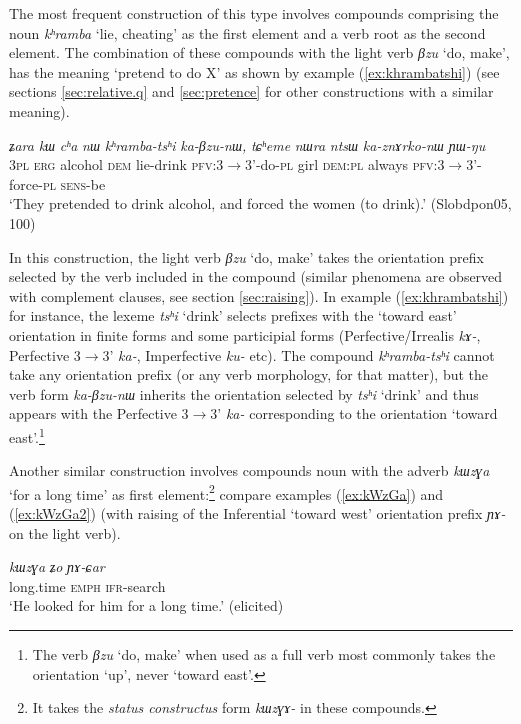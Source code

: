 \documentclass[oneside,a4paper,11pt]{article}
\newcommand{\ipa}[1]{\textit{\phon#1}}
\newcommand{\jpg}[2]{\ipa{#1} `#2'}
\newcommand{\refb}[1]{(\ref{#1})}
\begin{document}
The most frequent construction of this type involves compounds comprising the noun \jpg{kʰramba}{lie, cheating} as the first element and a verb root as the second element. The combination of these compounds with the light verb \jpg{βzu}{do, make}, has the meaning `pretend to do X' as shown by example \refb{ex:khrambatshi} (see sections \ref{sec:relative.q} and \ref{sec:pretence} for other constructions with a similar meaning).

\begin{exe}
\ex \label{ex:khrambatshi}
 \gll 
\ipa{ʑara} 	\ipa{kɯ} 	\ipa{cʰa} 	\ipa{nɯ} 	\ipa{kʰramba-tsʰi} 	\ipa{ka-βzu-nɯ,} 	\ipa{tɕʰeme} 	\ipa{nɯra} 	\ipa{ntsɯ} 	\ipa{ka-znɤrko-nɯ} 	\ipa{ɲɯ-ŋu}  \\
\textsc{3pl} \textsc{erg} alcohol \textsc{dem} lie-drink \textsc{pfv}:3$\rightarrow$3'-do-\textsc{pl} girl \textsc{dem:pl} always \textsc{pfv}:3$\rightarrow$3'-force-\textsc{pl}  \textsc{sens}-be \\
\glt `They pretended to drink alcohol, and forced the women (to drink).' (Slobdpon05, 100)
\end{exe}

In this construction, the light verb \jpg{βzu}{do, make} takes the orientation prefix selected by the verb included in the compound (similar phenomena are observed with complement clauses, see section \ref{sec:raising}). In example \refb{ex:khrambatshi} for instance, the lexeme \jpg{tsʰi}{drink} selects prefixes with the `toward east' orientation in finite forms and some participial forms (Perfective/Irrealis \ipa{kɤ-}, Perfective 3$\rightarrow$3' \ipa{ka-}, Imperfective \ipa{ku-} etc). The compound  \ipa{kʰramba-tsʰi} cannot take any orientation prefix (or any verb morphology, for that matter), but the verb form \ipa{ka-βzu-nɯ} inherits the orientation selected by \jpg{tsʰi}{drink} and thus appears with the Perfective 3$\rightarrow$3' \ipa{ka-} corresponding to the orientation `toward east'.\footnote{The verb \jpg{βzu}{do, make} when used as a full verb most commonly takes the orientation `up', never `toward east'.}

Another similar construction involves compounds noun with the adverb \jpg{kɯzɣa}{for a long time} as first element:\footnote{It takes the \textit{status constructus} form \ipa{kɯzɣɤ-} in these compounds.} compare examples \refb{ex:kWzGa} and \refb{ex:kWzGa2} (with raising of the Inferential `toward west' orientation prefix \ipa{ɲɤ-} on the light verb).

\begin{exe}
\ex \label{ex:kWzGa}
\gll 
\ipa{kɯzɣa} 	\ipa{ʑo} 	\ipa{ɲɤ-ɕar} \\
long.time \textsc{emph} \textsc{ifr}-search \\
\glt `He looked for him for a long time.' (elicited)
\end{exe}
\end{document}
